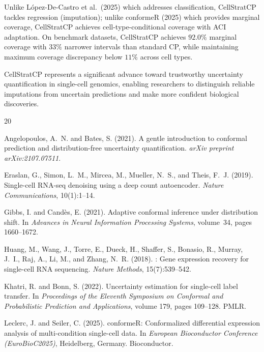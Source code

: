 \documentclass{article}
\begin{document}
Unlike L{\'o}pez-De-Castro et al.~(2025) which addresses classification, CellStratCP tackles regression (imputation); unlike conformeR (2025) which provides marginal coverage, CellStratCP achieves cell-type-conditional coverage with ACI adaptation. On benchmark datasets, CellStratCP achieves $92.0\%$ marginal coverage with $33\%$ narrower intervals than standard CP, while maintaining maximum coverage discrepancy below $11\%$ across cell types.

CellStratCP represents a significant advance toward trustworthy uncertainty quantification in single-cell genomics, enabling researchers to distinguish reliable imputations from uncertain predictions and make more confident biological discoveries.


\begin{thebibliography}{20}

Angelopoulos, A.~N. and Bates, S. (2021).
\newblock A gentle introduction to conformal prediction and distribution-free uncertainty quantification.
\newblock \emph{arXiv preprint arXiv:2107.07511}.

Eraslan, G., Simon, L.~M., Mircea, M., Mueller, N.~S., and Theis, F.~J. (2019).
\newblock Single-cell {RNA-seq} denoising using a deep count autoencoder.
\newblock \emph{Nature Communications}, 10(1):1--14.

Gibbs, I. and Cand{\`e}s, E. (2021).
\newblock Adaptive conformal inference under distribution shift.
\newblock In \emph{Advances in Neural Information Processing Systems}, volume~34, pages 1660--1672.

Huang, M., Wang, J., Torre, E., Dueck, H., Shaffer, S., Bonasio, R., Murray, J.~I., Raj, A., Li, M., and Zhang, N.~R. (2018).
: Gene expression recovery for single-cell {RNA} sequencing.
\newblock \emph{Nature Methods}, 15(7):539--542.

Khatri, R. and Bonn, S. (2022).
\newblock Uncertainty estimation for single-cell label transfer.
\newblock In \emph{Proceedings of the Eleventh Symposium on Conformal and Probabilistic Prediction and Applications}, volume 179, pages 109--128. PMLR.

Leclerc, J. and Seiler, C. (2025).
\newblock conforme{R}: Conformalized differential expression analysis of multi-condition single-cell data.
\newblock In \emph{European Bioconductor Conference (EuroBioC2025)}, Heidelberg, Germany. Bioconductor.


\end{thebibliography}
\end{document}
